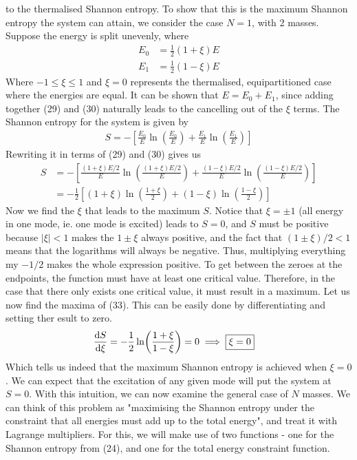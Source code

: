 \documentclass{article}
\begin{document}
to the thermalised Shannon entropy. To show that this is the maximum Shannon entropy the system can attain, 
we consider the case $N=1$, with 2 masses. Suppose the energy is split unevenly, where 
\begin{align}
    E_0&=\frac{1}{2}(1+\xi)E\\ 
    E_1&=\frac{1}{2}(1-\xi)E
\end{align}
Where $-1\leq\xi\leq1$ and $\xi=0$ represents the thermalised, equipartitioned case where the energies are equal.
It can be shown that $E=E_0+E_1$, since adding together (29) and (30) naturally leads to the cancelling out 
of the $\xi$ terms. The Shannon entropy for the system is given by
\begin{align}
    S=-[\frac{E_0}{E}\ln(\frac{E_0}{E})+\frac{E_1}{E}\ln(\frac{E_1}{E})]
\end{align}
Rewriting it in terms of (29) and (30) gives us 
\begin{align}
    S&=-[\frac{(1+\xi)E/2}{E}\ln(\frac{(1+\xi)E/2}{E})+\frac{(1-\xi)E/2}{E}\ln(\frac{(1-\xi)E/2}{E})]\\ 
    &=-\frac{1}{2}[(1+\xi)\ln(\frac{1+\xi}{2})+(1-\xi)\ln(\frac{1-\xi}{2})]
\end{align}
Now we find the $\xi$ that leads to the maximum $S$. Notice that $\xi=\pm1$ (all energy in one mode, ie. one mode is excited) leads to $S=0$, and $S$ must be 
positive because $|\xi|<1$ makes the $1\pm\xi$ always positive, and the fact that $(1\pm\xi)/2<1$ means that 
the logarithms will always be negative. Thus, multiplying everything my $-1/2$ makes the whole expression positive.
To get between the zeroes at the endpoints,
 the function must have at least one critical value. Therefore, in 
the case that there only exists one critical value, it must result in a maximum. Let us now find the 
maxima of (33). This can be easily done by differentiating and setting ther esult to zero. 
\begin{align}
    \dv{S}{\xi}&=-\frac{1}{2}\ln(\frac{1+\xi}{1-\xi})=0 \implies \boxed{\xi=0}
\end{align}
Which tells us indeed that the maximum Shannon entropy is achieved when $\xi=0$. 
We can expect that the excitation of any given
 mode will put the system at $S=0$.
With this intuition, we can now 
examine the general case of $N$ masses. We can think of this problem as "maximising the Shannon entropy 
under the constraint that all energies must add up to the total energy",
 and treat it with Lagrange multipliers. For this, we will make use of two functions - 
one for the Shannon entropy from (24), and one for the total energy constraint function. 
\end{document}

